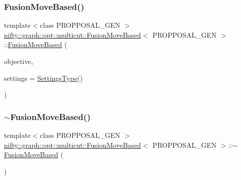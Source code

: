 \subsubsection{\texorpdfstring{Fusion\+Move\+Based()}{FusionMoveBased()}}
{\footnotesize\ttfamily template$<$class P\+R\+O\+P\+P\+O\+S\+A\+L\+\_\+\+G\+EN $>$ \\
\hyperlink{classnifty_1_1graph_1_1opt_1_1multicut_1_1FusionMoveBased}{nifty\+::graph\+::opt\+::multicut\+::\+Fusion\+Move\+Based}$<$ P\+R\+O\+P\+P\+O\+S\+A\+L\+\_\+\+G\+EN $>$\+::\hyperlink{classnifty_1_1graph_1_1opt_1_1multicut_1_1FusionMoveBased}{Fusion\+Move\+Based} (\begin{DoxyParamCaption}\item[{const \hyperlink{classnifty_1_1graph_1_1opt_1_1multicut_1_1FusionMoveBased_ac860a461dd2c12fd2e67553a4457ee58}{Objective\+Type} \&}]{objective,  }\item[{const \hyperlink{structnifty_1_1graph_1_1opt_1_1multicut_1_1FusionMoveBased_1_1SettingsType}{Settings\+Type} \&}]{settings = {\ttfamily \hyperlink{structnifty_1_1graph_1_1opt_1_1multicut_1_1FusionMoveBased_1_1SettingsType}{Settings\+Type}()} }\end{DoxyParamCaption})}

\mbox{\label{classnifty_1_1graph_1_1opt_1_1multicut_1_1FusionMoveBased_a9a04613260e31583aeffc9343e96a293}} 
\subsubsection{\texorpdfstring{$\sim$\+Fusion\+Move\+Based()}{~FusionMoveBased()}}
{\footnotesize\ttfamily template$<$class P\+R\+O\+P\+P\+O\+S\+A\+L\+\_\+\+G\+EN $>$ \\
\hyperlink{classnifty_1_1graph_1_1opt_1_1multicut_1_1FusionMoveBased}{nifty\+::graph\+::opt\+::multicut\+::\+Fusion\+Move\+Based}$<$ P\+R\+O\+P\+P\+O\+S\+A\+L\+\_\+\+G\+EN $>$\+::$\sim$\hyperlink{classnifty_1_1graph_1_1opt_1_1multicut_1_1FusionMoveBased}{Fusion\+Move\+Based} (\begin{DoxyParamCaption}{ }\end{DoxyParamCaption})}



